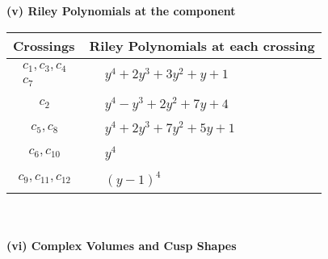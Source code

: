\documentclass[1p]{elsarticle_modified}
\theoremstyle{definition}
\begin{document}
\newpage\renewcommand{\arraystretch}{1}
\flushleft \textbf{(v) Riley Polynomials at the component}\newline \\
\begin{tabular}{m{50pt}|m{274pt}}
Crossings & \hspace{64pt}Riley Polynomials at each crossing \\
\hline $$\begin{aligned}c_{1},c_{3},c_{4}\\c_{7}\end{aligned}$$&$\begin{aligned}
&y^4+2 y^3+3 y^2+y+1
\end{aligned}$\\
\hline $$\begin{aligned}c_{2}\end{aligned}$$&$\begin{aligned}
&y^4- y^3+2 y^2+7 y+4
\end{aligned}$\\
\hline $$\begin{aligned}c_{5},c_{8}\end{aligned}$$&$\begin{aligned}
&y^4+2 y^3+7 y^2+5 y+1
\end{aligned}$\\
\hline $$\begin{aligned}c_{6},c_{10}\end{aligned}$$&$\begin{aligned}
&y^4
\end{aligned}$\\
\hline $$\begin{aligned}c_{9},c_{11},c_{12}\end{aligned}$$&$\begin{aligned}
&(y-1)^4
\end{aligned}$\\
\hline
\end{tabular}\\~\\
\newpage\flushleft \textbf{(vi) Complex Volumes and Cusp Shapes}
\end{document}
